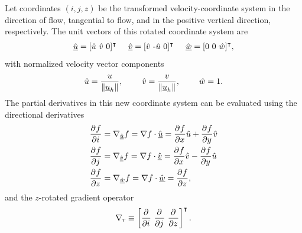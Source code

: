 Let coordinates $(i,j,z)$ be the transformed velocity-coordinate system in the direction of flow, tangential to flow, and in the positive vertical direction, respectively.  The unit vectors of this rotated coordinate system are
\begin{align}
  \label{flow_coordinate_vectors}
  \hat{\underline{u}} = [\hat{u}\ \hat{v}\ 0]^\intercal \hspace{5mm} 
  \hat{\underline{v}} = [\hat{v}\ \text{-}\hat{u}\ 0]^\intercal \hspace{5mm}
  \hat{\underline{w}} = [0\ 0\ \hat{w}]^\intercal,
\end{align}
with normalized velocity vector components
\begin{align}
  \label{normalized_velocity_components}
  \hat{u} = \frac{u}{\Vert \underline{u}_h \Vert}, \hspace{8mm}
  \hat{v} = \frac{v}{\Vert \underline{u}_h \Vert}, \hspace{8mm}
  \hat{w} = 1.
\end{align}
The partial derivatives in this new coordinate system can be evaluated using the directional derivatives 
\begin{align*}
  \frac{\partial^{} f}{\partial i^{} } &= \nabla_{\hat{\underline{u}}} f = \nabla f \cdot \hat{\underline{u}} = \frac{\partial^{} f}{\partial x^{} } \hat{u} + \frac{\partial^{} f}{\partial y^{} } \hat{v} \\
  \frac{\partial^{} f}{\partial j^{} } &= \nabla_{\hat{\underline{v}}} f = \nabla f \cdot \hat{\underline{v}} = \frac{\partial^{} f}{\partial x^{} } \hat{v} - \frac{\partial^{} f}{\partial y^{} } \hat{u} \\
  \frac{\partial^{} f}{\partial z^{} } &= \nabla_{\hat{\underline{w}}} f = \nabla f \cdot \hat{\underline{w}} = \frac{\partial^{} f}{\partial z^{} },
\end{align*} 
and the $z$-rotated gradient operator
\begin{align}
  \label{transformed_gradient_operator}
  \nabla_r \equiv \left[ \frac{\partial^{} }{\partial i^{} }\ \frac{\partial^{} }{\partial j^{} }\ \frac{\partial^{} }{\partial z^{} } \right]^\intercal.
\end{align}

